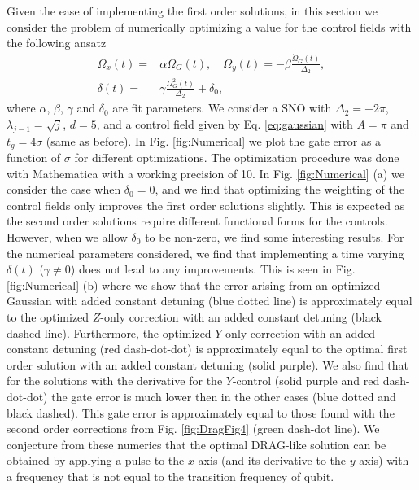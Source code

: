\documentclass[pra,twocolumn,floatfix,superscriptaddress,eqsecnum]{revtex4-1}
\begin{document}
Given the ease of implementing the first order solutions, in this section we consider the problem of numerically optimizing a value for the control fields with the following ansatz
\begin{equation}
\begin{split}
\Omega_{x}(t) =& \alpha\Omega_G(t) ,\quad
\Omega_{y}(t)=  -\beta\frac{\dot\Omega_G(t)}{\Delta_2},\\
\delta (t)=& \gamma\frac{\Omega_G^2(t)}{\Delta_2}+\delta_0, 
  \end{split}
\end{equation} where $\alpha$, $\beta$, $\gamma$  and $\delta_0$ are fit parameters. We consider a SNO with $\Delta_2=-2\pi$, $\lambda_{j-1}=\sqrt{j}$, $d=5$, and a control field given by Eq. \eqref{eq:gaussian} with $A=\pi$ and $t_g=4\sigma$ (same as before). In Fig. \ref{fig:Numerical} we plot the gate error as a function of $\sigma$ for different optimizations. The optimization procedure was done with Mathematica with a working precision of 10. In Fig. \ref{fig:Numerical} (a) we consider the case when $\delta_0=0$, and we find that optimizing the weighting of the control fields only improves the first order solutions slightly. This is expected as the second order solutions require different functional forms for the controls.
However, when we allow $\delta_0$ to be non-zero, we find some interesting results. For the numerical parameters considered, we find that implementing a time varying $\delta(t)$ ($\gamma\neq 0$) does not lead to any improvements. This is seen in Fig. \ref{fig:Numerical} (b) where we show that the error arising  from an optimized Gaussian with added constant detuning (blue dotted line) is approximately equal to the optimized $Z$-only correction with an added constant detuning (black dashed line).  Furthermore, the optimized $Y$-only correction with an added constant detuning (red dash-dot-dot) is approximately equal to the optimal first order solution with an added constant detuning (solid purple).  We also find that for the solutions with the derivative for the $Y$-control (solid purple and red dash-dot-dot) the gate error is much lower then in the other cases (blue dotted and black dashed). This gate error is approximately equal to those found with the second order corrections from Fig. \ref{fig:DragFig4} (green dash-dot line).  We conjecture from these numerics that the optimal DRAG-like solution can be obtained by applying a pulse to the $x$-axis (and its derivative to the $y$-axis) with a frequency that is not equal to the transition frequency of qubit.  
\end{document}
